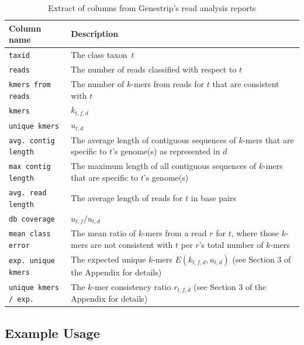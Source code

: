\documentclass[pdflatex,sn-vancouver-num]{sn-jnl}
\newcommand{\taxon}{taxon}
\begin{document}
    \begin{table}[h]
        \centering
        \begin{tabular}{l|p{9cm}}
            \textbf{Column name} & \textbf{Description}  \\
            \hline
            \verb|taxid| & The class \taxon\ $t$ \\
            \verb|reads| & The number of reads classified with respect to $t$\\
            \verb|kmers from reads| & The number of $k$-mers from reads for $t$ that are consistent with $t$ \\
            \verb|kmers| & $k_{t,f,d}$\\ %
            \verb|unique kmers| & $u_{t,d}$\\ %
            \verb|avg. contig length| & The average length of contiguous sequences of $k$-mers that are specific to $t$'s genome(s) as represented in $d$ \\
            \verb|max contig length| & The maximum length of all contiguous sequences of $k$-mers that are specific to $t$'s genome(s)  \\
            \verb|avg. read length| & The average length of reads for $t$ in base pairs \\
            \verb|db coverage| & $u_{t,f} / u_{t,d}$ \\
            \verb|mean class error| & The mean ratio of $k$-mers from a read $r$ for $t$, where those $k$-mers are not consistent with $t$ per $r$'s total number of $k$-mers \\
            \verb|exp. unique kmers| & The expected unique $k$-mers $E(k_{t,f,d},u_{t,d})$ (see Section 3 %
             of the Appendix for details)\\
            \verb|unique kmers / exp.| & The $k$-mer consistency ratio $r_{t,f,d}$ (see Section 3 %
             of the Appendix for details)\\
        \end{tabular}
        \caption{Extract of columns from Genestrip's read analysis reports}\label{csvcolumns}
    \end{table}

    \subsection{Example Usage}
    
\end{document}
